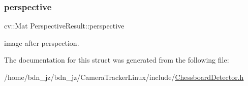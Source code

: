 \subsubsection{\texorpdfstring{perspective}{perspective}}
{\footnotesize\ttfamily cv\+::\+Mat Perspective\+Result\+::perspective}

image after perspection. 

The documentation for this struct was generated from the following file\+:\begin{DoxyCompactItemize}
\item 
/home/bdn\+\_\+jz/bdn\+\_\+jz/\+Camera\+Tracker\+Linux/include/\hyperlink{_chessboard_detector_8h}{Chessboard\+Detector.\+h}\end{DoxyCompactItemize}
